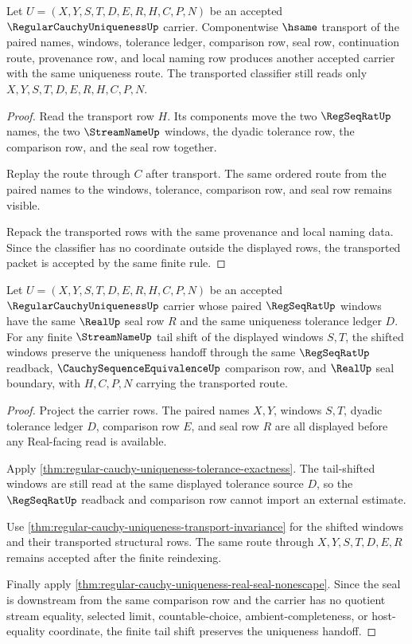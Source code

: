 \begin{theorem}
\label{thm:regular-cauchy-uniqueness-transport-invariance}
Let $U=(X,Y,S,T,D,E,R,H,C,P,N)$ be an accepted $\RegularCauchyUniquenessUp$ carrier. Componentwise $\hsame$ transport of the paired names, windows, tolerance ledger, comparison row, seal row, continuation route, provenance row, and local naming row produces another accepted carrier with the same uniqueness route. The transported classifier still reads only $X,Y,S,T,D,E,R,H,C,P,N$.
\end{theorem}
\begin{proof}
Read the transport row $H$. Its components move the two $\RegSeqRatUp$ names, the two $\StreamNameUp$ windows, the dyadic tolerance row, the comparison row, and the seal row together.

Replay the route through $C$ after transport. The same ordered route from the paired names to the windows, tolerance, comparison row, and seal row remains visible.

Repack the transported rows with the same provenance and local naming data. Since the classifier has no coordinate outside the displayed rows, the transported packet is accepted by the same finite rule.
\end{proof}

\begin{theorem}
\label{thm:regular-cauchy-uniqueness-tail-shift-stability}
Let $U=(X,Y,S,T,D,E,R,H,C,P,N)$ be an accepted $\RegularCauchyUniquenessUp$ carrier whose paired $\RegSeqRatUp$ windows have the same $\RealUp$ seal row $R$ and the same uniqueness tolerance ledger $D$. For any finite $\StreamNameUp$ tail shift of the displayed windows $S,T$, the shifted windows preserve the uniqueness handoff through the same $\RegSeqRatUp$ readback, $\CauchySequenceEquivalenceUp$ comparison row, and $\RealUp$ seal boundary, with $H,C,P,N$ carrying the transported route.
\end{theorem}
\begin{proof}
Project the carrier rows. The paired names $X,Y$, windows $S,T$, dyadic tolerance ledger $D$, comparison row $E$, and seal row $R$ are all displayed before any Real-facing read is available.

Apply \autoref{thm:regular-cauchy-uniqueness-tolerance-exactness}. The tail-shifted windows are still read at the same displayed tolerance source $D$, so the $\RegSeqRatUp$ readback and comparison row cannot import an external estimate.

Use \autoref{thm:regular-cauchy-uniqueness-transport-invariance} for the shifted windows and their transported structural rows. The same route through $X,Y,S,T,D,E,R$ remains accepted after the finite reindexing.

Finally apply \autoref{thm:regular-cauchy-uniqueness-real-seal-nonescape}. Since the seal is downstream from the same comparison row and the carrier has no quotient stream equality, selected limit, countable-choice, ambient-completeness, or host-equality coordinate, the finite tail shift preserves the uniqueness handoff.
\end{proof}

